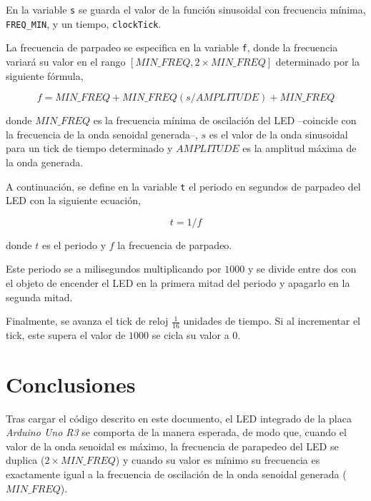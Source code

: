 \documentclass[10pt,a4paper]{report}
\begin{document}
	En la variable \texttt{s} se guarda el valor de la función sinusoidal con frecuencia mínima, \texttt{FREQ\_MIN}, y un tiempo, \texttt{clockTick}.
	
	La frecuencia de parpadeo se especifica en la variable \texttt{f}, donde la frecuencia variará su valor en el rango $\left[ MIN\_FREQ, 2 \times MIN\_FREQ \right]$ determinado por la siguiente fórmula,
	
	\begin{equation*}
		f = MIN\_FREQ + MIN\_FREQ(s / AMPLITUDE) + MIN\_FREQ
	\end{equation*}
	
	donde $MIN\_FREQ$ es la frecuencia mínima de oscilación del LED --coincide con la frecuencia de la onda senoidal generada--, $s$ es el valor de la onda sinusoidal para un tick de tiempo determinado y $AMPLITUDE$ es la amplitud máxima de la onda generada.
	
	A continuación, se define en la variable \texttt{t} el periodo en segundos de parpadeo del LED con la siguiente ecuación,
	
	\begin{equation*}
	t = 1 / f
	\end{equation*}
	
	donde $t$ es el periodo y $f$ la frecuencia de parpadeo.
	
	Este periodo se a milisegundos multiplicando por $1000$ y se divide entre dos con el objeto de encender el LED en la primera mitad del periodo y apagarlo en la segunda mitad.
	
	Finalmente, se avanza el tick de reloj $\frac{1}{16}$ unidades de tiempo. Si al incrementar el tick, este supera el valor de $1000$ se cicla su valor a $0$.
	
		
	
	\chapter{Conclusiones}	
	Tras cargar el código descrito en este documento, el LED integrado de la placa \textit{Arduino Uno R3} se comporta de la manera esperada, de modo que, cuando el valor de la onda senoidal es máximo, la frecuencia de parapedeo del LED se duplica ($2\times MIN\_FREQ$) y cuando su valor es mínimo su frecuencia es exactamente igual a la frecuencia de oscilación de la onda senoidal generada ($MIN\_FREQ$).
	
\end{document}
